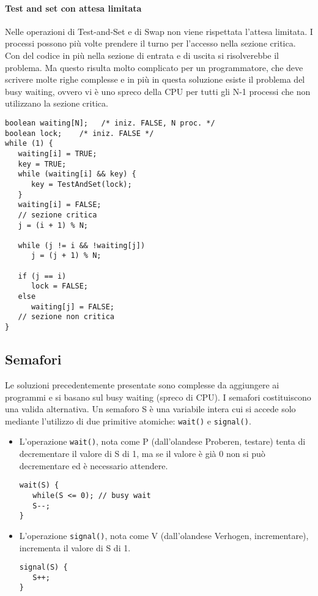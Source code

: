 \documentclass[a4paper]{article}
\begin{document}
\paragraph{Test and set con attesa limitata}
Nelle operazioni di Test-and-Set e di Swap non viene rispettata l’attesa limitata. I processi possono più volte prendere il turno per l’accesso nella sezione critica. Con del codice in più nella sezione di entrata e di uscita si risolverebbe il problema. Ma questo risulta molto complicato per un programmatore, che deve scrivere molte righe complesse e in più in questa soluzione esiste il problema del busy waiting, ovvero vi è uno spreco della CPU per tutti gli N-1 processi che non utilizzano la sezione critica.
\begin{verbatim}
boolean waiting[N];   /* iniz. FALSE, N proc. */
boolean lock;    /* iniz. FALSE */
while (1) {
   waiting[i] = TRUE;
   key = TRUE;
   while (waiting[i] && key) {
      key = TestAndSet(lock);
   }
   waiting[i] = FALSE;
   // sezione critica
   j = (i + 1) % N;
   
   while (j != i && !waiting[j])
      j = (j + 1) % N;
   
   if (j == i) 
      lock = FALSE;
   else
      waiting[j] = FALSE;
   // sezione non critica
}
\end{verbatim}

\subsection{Semafori}
Le soluzioni precedentemente presentate sono complesse da aggiungere ai programmi e si basano sul busy waiting (spreco di CPU). I semafori costituiscono una valida alternativa.
Un semaforo S è una variabile intera cui si accede solo mediante l'utilizzo di due primitive atomiche: \texttt{wait()} e \texttt{signal()}.
\begin{itemize}
    \item L'operazione \texttt{wait()}, nota come P (dall'olandese Proberen, testare) tenta di decrementare il valore di S di 1, ma se il valore è già 0 non si può decrementare ed è necessario attendere.
          \begin{verbatim}
wait(S) {
   while(S <= 0); // busy wait
   S--;
}
\end{verbatim}
    \item L'operazione \texttt{signal()}, nota come V (dall'olandese Verhogen, incrementare), incrementa il valore di S di 1.
          \begin{verbatim}
signal(S) {
   S++;
}
\end{verbatim}
\end{itemize}
\end{document}
